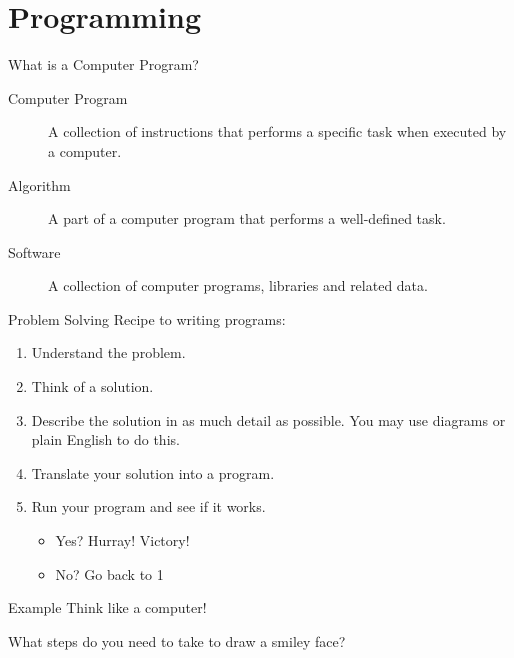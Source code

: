 \documentclass[../lecture1-introduction.tex]{subfiles}
\begin{document}
\section{Programming}


\begin{frame}[fragile]{What is a Computer Program?}
    \begin{description}
        \item[Computer Program] A collection of instructions that performs a specific
        task when executed by a computer. \pause
        \item[Algorithm] A part of a computer program that performs a
        well-defined task. \pause
        \item[Software] A collection of computer programs, libraries and
        related data.
    \end{description}
\end{frame}


\begin{frame}[fragile]{Problem Solving}
    Recipe to writing programs: \pause
    \begin{enumerate}
        \item Understand the problem. \pause
        \item Think of a solution. \pause
        \item Describe the solution in as much detail as possible. \newline
              You may use diagrams or plain English to do this. \pause
        \item Translate your solution into a program. \pause
        \item Run your program and see if it works. \pause
        \begin{itemize}
            \item Yes? Hurray! Victory! \pause
            \item No? Go back to 1
        \end{itemize}
    \end{enumerate}
\end{frame}


\begin{frame}[fragile]{Example}
    Think like a computer! \newline

    What steps do you need to take to draw a smiley face?
\end{frame}
\end{document}
